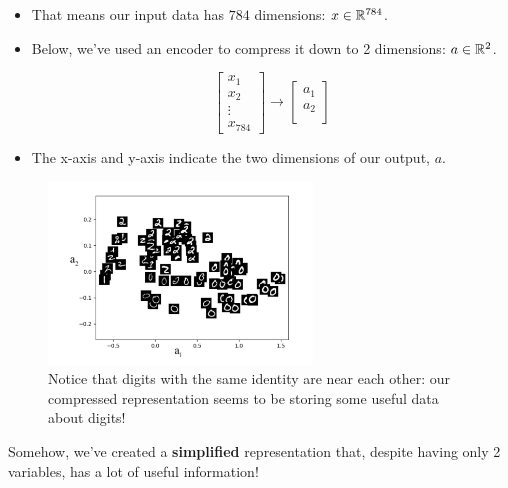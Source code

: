         \begin{itemize}
            \item That means our input data has $784$ dimensions: $x \in \mathbb R^{784}$.
    
            \item Below, we've used an encoder to compress it down to 2 dimensions: $a \in \mathbb R^2$.
    
            \begin{equation}
                \begin{bmatrix}
                x_1 \\ x_2 \\  \vdots \\ x_{784}
                \end{bmatrix}
                \longrightarrow
                \begin{bmatrix}
                    a_1 \\ a_2 \\ 
                \end{bmatrix}
            \end{equation}
    
            \item The x-axis and y-axis indicate the two dimensions of our output, $a$.
        \end{itemize}
    
        \begin{figure}[H]
            \centering
            \includegraphics[width=70mm,scale=0.5]{images/autoencoder_images/mnist_compression.png}
            \caption*{Notice that digits with the same identity are near each other: our compressed representation seems to be storing some useful data about digits!}
        \end{figure}
    
        Somehow, we've created a \textbf{simplified} representation that, despite having only 2 variables, has a lot of useful information!

